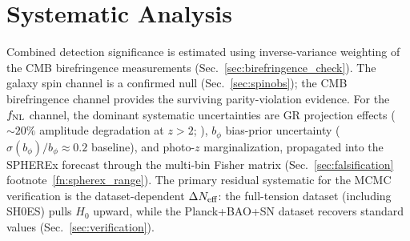 \documentclass[aps,prd,twocolumn,superscriptaddress,showpacs,preprintnumbers,nofootinbib,longbibliography,floatfix]{revtex4-2}
\newcommand{\Neff}{N_{\rm eff}}
\begin{document}
\section{Systematic Analysis}\label{sec:systematics}
Combined detection significance is estimated using inverse-variance weighting of the CMB birefringence measurements (Sec.~\ref{sec:birefringence_check}). The galaxy spin channel is a confirmed null (Sec.~\ref{sec:spinobs}); the CMB birefringence channel provides the surviving parity-violation evidence. For the $f_{\rm NL}$ channel, the dominant systematic uncertainties are GR projection effects (${\sim}20\%$ amplitude degradation at $z>2$; \cite{Heinrich:2023}), $b_\phi$ bias-prior uncertainty ($\sigma(b_\phi)/b_\phi \approx 0.2$ baseline), and photo-$z$ marginalization, propagated into the SPHEREx forecast through the multi-bin Fisher matrix (Sec.~\ref{sec:falsification} footnote~\ref{fn:spherex_range}). The primary residual systematic for the MCMC verification is the dataset-dependent $\Delta\Neff$: the full-tension dataset (including SH0ES) pulls $H_0$ upward, while the Planck+BAO+SN dataset recovers standard values (Sec.~\ref{sec:verification}).



\end{document}
